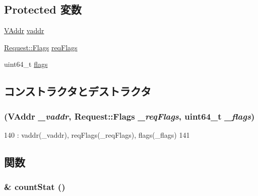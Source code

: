 \subsection*{Protected 変数}
\begin{DoxyCompactItemize}
\item 
\hyperlink{structAlphaISA_1_1VAddr}{VAddr} \hyperlink{classAlphaISA_1_1DtbFault_a48d5190e0fd672e7fe9d248a670b8ea3}{vaddr}
\item 
\hyperlink{classFlags}{Request::Flags} \hyperlink{classAlphaISA_1_1DtbFault_a4342a385c094b40ed46b0674fbb0b223}{reqFlags}
\item 
uint64\_\-t \hyperlink{classAlphaISA_1_1DtbFault_a899a76dc5f03f0d4ea3793c339e07ee9}{flags}
\end{DoxyCompactItemize}


\subsection{コンストラクタとデストラクタ}
\hypertarget{classAlphaISA_1_1DtbFault_a74e89dcaff8c62058a1ecabdf3b0e641}{
\subsubsection[{DtbFault}]{ ({\bf VAddr} {\em \_\-vaddr}, \/  {\bf Request::Flags} {\em \_\-reqFlags}, \/  uint64\_\-t {\em \_\-flags})}}
\label{classAlphaISA_1_1DtbFault_a74e89dcaff8c62058a1ecabdf3b0e641}



\begin{DoxyCode}
140         : vaddr(_vaddr), reqFlags(_reqFlags), flags(_flags)
141     { }
\end{DoxyCode}


\subsection{関数}
\hypertarget{classAlphaISA_1_1DtbFault_a4b643982263b390349238a6711216763}{
\subsubsection[{countStat}]{\& countStat ()}}
\label{classAlphaISA_1_1DtbFault_a4b643982263b390349238a6711216763}


